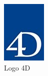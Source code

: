 \begin{figure}[h]
    \centering
    \includegraphics[scale=0.8]{Images/logo-4d.jpg} %
    \caption{Logo 4D\cite{4d}}
    \label{fig:Logo4D}
\end{figure}









